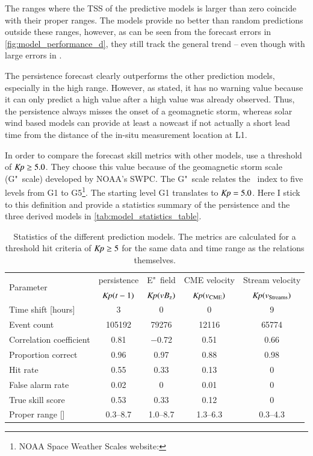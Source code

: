 The \Kp{} ranges where the TSS of the predictive models is larger than zero coincide with their proper ranges. The models provide no better than random predictions outside these ranges, however, as can be seen from the forecast errors in \autoref{fig:model_performance_d}, they still track the general trend -- even though with large errors in \Kp{}.

The persistence forecast clearly outperforms the other prediction models, especially in the high \Kp{} range. However, as \citet{Detman1999} stated, it has no warning value because it can only predict a high \Kp{} value after a high \Kp{} value was already observed. Thus, the persistence always misses the onset of a geomagnetic storm, whereas solar wind based models can provide at least a nowcast if not actually a short lead time from the distance of the in-situ measurement location at L1.

In order to compare the \Kp{} forecast skill metrics with other models, \citet{Savani2017} use a threshold of $\textit{Kp}{} \geq 5.0$. They choose this value because of the geomagnetic storm scale (G"~scale) developed by NOAA's SWPC. The G"~scale relates the \Kp~index to five levels from G1 to G5\footnote{NOAA Space Weather Scales website: }. The starting level G1 translates to $\text{\textit{Kp}} = 5.0$. Here I stick to this definition and provide a statistics summary of the \Kp{} persistence and the three derived models in \autoref{tab:model_statistics_table}.
\begin{table}[htb]
	\caption{Statistics of the different prediction models. The metrics are calculated for a threshold hit criteria of $\textit{Kp}{} \geq 5$ for the same data and time range as the relations themselves.}
	\label{tab:model_statistics_table}
	\centering
	\begin{tabular}{lcccc}
		\hline\hline
		\multirow{2}{*}{Parameter}	&\Kp{} persistence	&E"~field	&CME velocity 	&Stream velocity\\
			&$\textit{Kp}(t-1)$	&$\textit{Kp}(\text{$vB_\text{z}$})$	&$\textit{Kp}(v_\text{CME})$	&$\textit{Kp}(v_\text{Streams})$\\
		\hline
		Time shift [hours]	&3	&0	&0	&9\\
		Event count	&\num{105192}	&\num{79276}	&\num{12116}	&\num{65774}\\
		Correlation coefficient	&0.81	&\num{-0.72}	&0.51	&0.66\\
		\hline
		Proportion correct	&0.96	&0.97	&0.88	&0.98\\
		Hit rate	&0.55	&0.33	&0.13	&0\\
		False alarm rate	&0.02	&0	&0.01	&0\\
		True skill score	&0.53	&0.33	&0.12	&0\\
		Proper range [\Kp{}]	&\numrange{0.3}{8.7}	&\numrange{1.0}{8.7}	&\numrange{1.3}{6.3}	&\numrange{0.3}{4.3}\\
		\hline
	\end{tabular}
\end{table}


